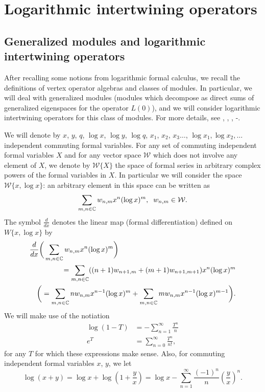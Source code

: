 \documentclass[12pt]{article}
\begin{document}
\section{Logarithmic intertwining operators} \label{sec:1}

\subsection{Generalized modules and logarithmic intertwining operators}
\label{s-int-op}

After recalling some notions from logarithmic formal calculus, we recall the definitions
of vertex operator algebras and classes of modules. In particular, we will
deal with generalized modules (modules which decompose as direct sums of
generalized eigenspaces for the operator $L(0)$), and we will consider logarithmic
intertwining operators for this class of modules. For more details, see
\cite{FLM}, \cite{FHL}, \cite{LL}, \cite{HLZ1}-\cite{HLZ7}.

We will denote by $x$, $y$, $q$, $\log x$, $\log y$, $\log q$, $x_1$,
$x_2$, $x_3\ldots$, $\log x_1, \log x_2, \ldots$ independent
commuting formal variables.
For any set of commuting independent formal variables $X$ and
for any vector space $\mathcal W$ which does not involve any element of $X$,
we denote by $\mathcal W\{X\}$ the
space of formal series in arbitrary complex powers of the formal variables
in $X$.
In particular we will consider the space $\mathcal W \{x, \log x\}$:
an arbitrary element in this space can be written as
\begin{equation}\label{log:f}
\sum_{m,n\in {\mathbb C}}w_{n,m}x^n(\log x)^m,\;\;
w_{n,m}\in {\cal W}.
\end{equation}
The symbol $\frac{d}{dx}$ denotes the linear map (formal differentiation)
defined on $W\{x, \log x\}$ by
\begin{align}\label{ddxdef}
\lefteqn{\frac d{dx}\bigg(\sum_{m,n\in {\mathbb C}}w_{n,m}x^n(\log
x)^m\bigg)}\nn
&&\;\;\;=\sum_{m,n\in{\mathbb C}}((n+1)w_{n+1,m}+ (m+1)w_{n+1,m+1})x^{n}(\log
x)^{m}\nn
&&\bigg(=\sum_{m,n\in{\mathbb C}}nw_{n,m}x^{n-1}(\log x)^m+ \sum_{m,n\in
{\mathbb C}}mw_{n,m}x^{n-1}(\log x)^{m-1}\bigg).
\end{align}
We will make use of the notiation
\begin{align*}
  \log(1 - T) &= -\sum_{n=1}^\infty \frac{T^n}{n}\\
  e^T & = \sum_{n=0}^\infty \frac{T^n}{n!},
\end{align*}
for any $T$ for which these expressions make sense.
Also, for commuting independent formal variables $x$, $y$,
we let
$$
  \log(x + y) = \log x + \log\left(1 + \frac{y}{x}\right)
    = \log x - \sum_{n=1}^\infty \frac{(-1)^n}{n}
    \left(\frac{y}{x}\right)^n.
$$
\end{document}
